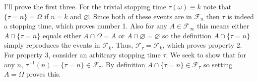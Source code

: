 \documentclass[12pt]{article}
\begin{document}
I'll prove the first three. For the trivial stopping time $\tau(\omega) \equiv k$ note that $\{\tau = n\} = \Omega$ if $n = k$ and $\varnothing$. Since both of these events are in $\mathcal{F}_n$
then $\tau$ is indeed a stopping time, which proves number 1. Also for any $A \in \mathcal{F}_\infty$ this means either $A \cap \{\tau = n\}$ equals either $A \cap \Omega = A$ or 
$A \cap \varnothing = \varnothing$ so the definition $A \cap \{\tau = n\}$ simply reproduces the events in $\mathcal{F}_k$. Thus, $\mathcal{F}_\tau = \mathcal{F}_k$, which proves property 2. 
For property 3, consider an arbitrary stopping time $\tau$. We seek to show that for any $n$, $\tau^{-1}(n) = \{\tau = n\} \in \mathcal{F}_\tau$. By definition 
$A \cap \{\tau = n\} \in \mathcal{F}_\tau$ so setting $A = \Omega$ proves this. 
\end{document}
